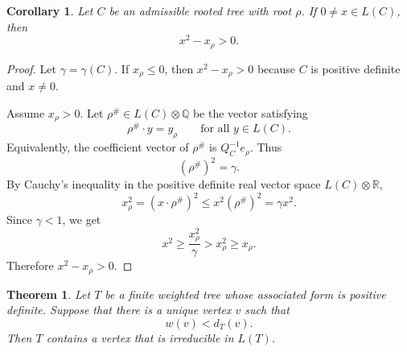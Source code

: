 \documentclass[12pt]{article}
\newtheorem{theorem}{Theorem}
\newtheorem{corollary}{Corollary}
\begin{document}
\begin{corollary}
Let \(C\) be an admissible rooted tree with root \(\rho\). If \(0\ne x\in L(C)\), then
\[
x^2-x_\rho>0.
\]
\end{corollary}

\begin{proof}
Let \(\gamma=\gamma(C)\). If \(x_\rho\le 0\), then \(x^2-x_\rho>0\) because \(C\) is positive definite and \(x\ne 0\).

Assume \(x_\rho>0\). Let \(\rho^\#\in L(C)\otimes \mathbb Q\) be the vector satisfying
\[
\rho^\#\cdot y=y_\rho
\qquad
\text{for all } y\in L(C).
\]
Equivalently, the coefficient vector of \(\rho^\#\) is \(Q_C^{-1}e_\rho\). Thus
\[
(\rho^\#)^2=\gamma.
\]
By Cauchy's inequality in the positive definite real vector space \(L(C)\otimes\mathbb R\),
\[
x_\rho^2=(x\cdot \rho^\#)^2\le x^2(\rho^\#)^2=\gamma x^2.
\]
Since \(\gamma<1\), we get
\[
x^2\ge \frac{x_\rho^2}{\gamma}>x_\rho^2\ge x_\rho.
\]
Therefore \(x^2-x_\rho>0\).
\end{proof}

\begin{theorem}
Let \(T\) be a finite weighted tree whose associated form is positive definite. Suppose that there is a unique vertex \(v\) such that
\[
w(v)<d_T(v).
\]
Then \(T\) contains a vertex that is irreducible in \(L(T)\).
\end{theorem}
\end{document}
